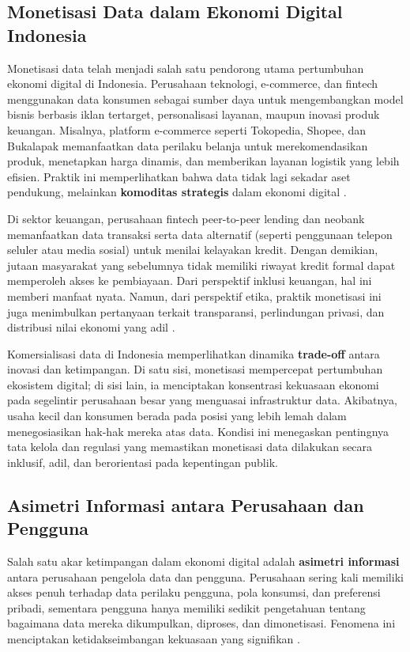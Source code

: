 \subsection{Monetisasi Data dalam Ekonomi Digital Indonesia}

Monetisasi data telah menjadi salah satu pendorong utama pertumbuhan ekonomi digital di Indonesia. Perusahaan teknologi, e-commerce, dan fintech menggunakan data konsumen sebagai sumber daya untuk mengembangkan model bisnis berbasis iklan tertarget, personalisasi layanan, maupun inovasi produk keuangan. Misalnya, platform e-commerce seperti Tokopedia, Shopee, dan Bukalapak memanfaatkan data perilaku belanja untuk merekomendasikan produk, menetapkan harga dinamis, dan memberikan layanan logistik yang lebih efisien. Praktik ini memperlihatkan bahwa data tidak lagi sekadar aset pendukung, melainkan \textbf{komoditas strategis} dalam ekonomi digital \cite{zuiderwijk2021data}.  

Di sektor keuangan, perusahaan fintech peer-to-peer lending dan neobank memanfaatkan data transaksi serta data alternatif (seperti penggunaan telepon seluler atau media sosial) untuk menilai kelayakan kredit. Dengan demikian, jutaan masyarakat yang sebelumnya tidak memiliki riwayat kredit formal dapat memperoleh akses ke pembiayaan. Dari perspektif inklusi keuangan, hal ini memberi manfaat nyata. Namun, dari perspektif etika, praktik monetisasi ini juga menimbulkan pertanyaan terkait transparansi, perlindungan privasi, dan distribusi nilai ekonomi yang adil \cite{lim2018business}.  

Komersialisasi data di Indonesia memperlihatkan dinamika \textbf{trade-off} antara inovasi dan ketimpangan. Di satu sisi, monetisasi mempercepat pertumbuhan ekosistem digital; di sisi lain, ia menciptakan konsentrasi kekuasaan ekonomi pada segelintir perusahaan besar yang menguasai infrastruktur data. Akibatnya, usaha kecil dan konsumen berada pada posisi yang lebih lemah dalam menegosiasikan hak-hak mereka atas data. Kondisi ini menegaskan pentingnya tata kelola dan regulasi yang memastikan monetisasi data dilakukan secara inklusif, adil, dan berorientasi pada kepentingan publik.

\subsection{Asimetri Informasi antara Perusahaan dan Pengguna}

Salah satu akar ketimpangan dalam ekonomi digital adalah \textbf{asimetri informasi} antara perusahaan pengelola data dan pengguna. Perusahaan sering kali memiliki akses penuh terhadap data perilaku pengguna, pola konsumsi, dan preferensi pribadi, sementara pengguna hanya memiliki sedikit pengetahuan tentang bagaimana data mereka dikumpulkan, diproses, dan dimonetisasi. Fenomena ini menciptakan ketidakseimbangan kekuasaan yang signifikan \cite{acquisti2015privacy}.  

